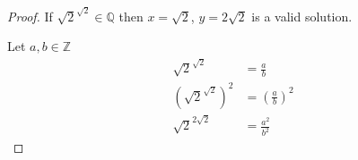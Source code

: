 \documentclass[12pt,a4paper,reqno,parskip=full]{amsart}
\numberwithin{equation}{section}
\theoremstyle{plain}
\theoremstyle{definition}
\begin{document}
\begin{enumerate}
\begin{proof}
          If $\sqrt{2}^{\sqrt{2}}\in\mathbb{Q}$ then $x = \sqrt{2}$, $y = 2\sqrt{2}$ is a valid solution.

          Let $a,b\in\mathbb{Z}$
          \begin{align*}
            \sqrt{2}^{\sqrt{2}}                & = \frac{a}{b}                \\
            \left(\sqrt{2}^{\sqrt{2}}\right)^2 & = \left(\frac{a}{b}\right)^2 \\
            \sqrt{2}^{2\sqrt{2}}               & = \frac{a^2}{b^2}
          \end{align*}
        \end{proof}
\end{enumerate}
\end{document}
